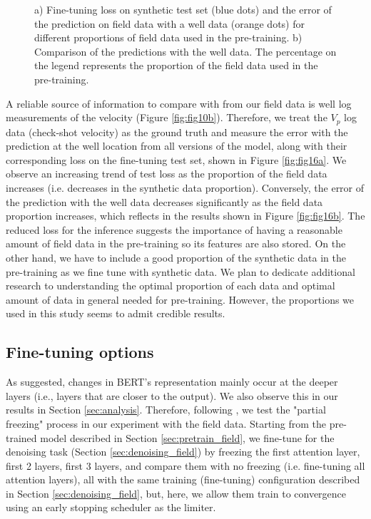 \documentclass{article}
\begin{document}
\begin{figure}[h]
    \centering
    \caption{a) Fine-tuning loss on synthetic test set (blue dots) and the error of the prediction on field data with a well data (orange dots) for different proportions of field data used in the pre-training. b) Comparison of the predictions with the well data. The percentage on the legend represents the proportion of the field data used in the pre-training.}
    \label{fig:fig16}
\end{figure}

A reliable source of information to compare with from our field data is well log measurements of the velocity (Figure \ref{fig:fig10b}). Therefore, we treat the $V_p$ log data (check-shot velocity) as the ground truth and measure the error with the prediction at the well location from all versions of the model, along with their corresponding loss on the fine-tuning test set, shown in Figure \ref{fig:fig16a}. We observe an increasing trend of test loss as the proportion of the field data increases (i.e. decreases in the synthetic data proportion). Conversely, the error of the prediction with the well data decreases significantly as the field data proportion increases, which reflects in the results shown in Figure \ref{fig:fig16b}. The reduced loss for the inference suggests the importance of having a reasonable amount of field data in the pre-training so its features are also stored. On the other hand, we have to include a good proportion of the synthetic data in the pre-training as we fine tune with synthetic data. We plan to dedicate additional research to understanding the optimal proportion of each data and optimal amount of data in general needed for pre-training. However, the proportions we used in this study seems to admit credible results.

\subsection{Fine-tuning options}
\label{sec:technique}

As \cite{merchant2020happens} suggested, changes in BERT's representation mainly occur at the deeper layers (i.e., layers that are closer to the output). We also observe this in our results in Section \ref{sec:analysis}. Therefore, following \cite{merchant2020happens}, we test the "partial freezing" process in our experiment with the field data. Starting from the pre-trained model described in Section \ref{sec:pretrain_field}, we fine-tune for the denoising task (Section \ref{sec:denoising_field}) by freezing the first attention layer, first 2 layers, first 3 layers, and compare them with no freezing (i.e. fine-tuning all attention layers), all with the same training (fine-tuning) configuration described in Section \ref{sec:denoising_field}, but, here, we allow them train to convergence using an early stopping scheduler as the limiter.
\end{document}
